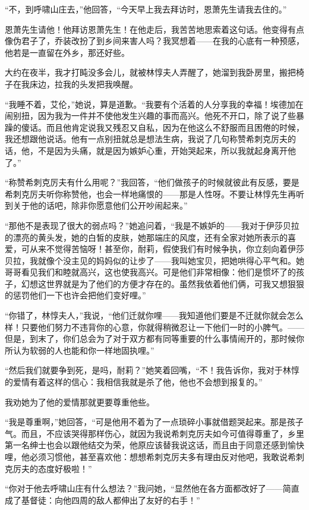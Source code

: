 \par “不，到呼啸山庄去，”他回答，“今天早上我去拜访时，恩萧先生请我去住的。”
\par 恩萧先生请他！他拜访恩萧先生！在他走后，我苦苦地思索着这句话。他变得有点像伪君子了，乔装改扮了到乡间来害人吗？我冥想着——在我的心底有一种预感，他若是一直留在外乡，那还好些。
\par 大约在夜半，我才打盹没多会儿，就被林惇夫人弄醒了，她溜到我卧房里，搬把椅子在我床边，拉我的头发把我唤醒。
\par “我睡不着，艾伦，”她说，算是道歉。“我要有个活着的人分享我的幸福！埃德加在闹别扭，因为我为一件并不使他发生兴趣的事而高兴。他死不开口，除了说了些暴躁的傻话。而且他肯定说我又残忍又自私，因为在他这么不舒服而且困倦的时候，我还想跟他说话。他有一点别扭就总是想法生病，我说了几句称赞希刺克厉夫的话，他，不是因为头痛，就是因为嫉妒心重，开始哭起来，所以我就起身离开他了。”
\par “称赞希刺克厉夫有什么用呢？”我回答，“他们做孩子的时候就彼此有反感，要是希刺克厉夫听你称赞他，也会一样地痛恨的——那是人性呀。不要让林惇先生再听到关于他的话吧，除非你愿意他们公开吵闹起来。”
\par “那他不是表现了很大的弱点吗？”她追问着，“我是不嫉妒的——我对于伊莎贝拉的漂亮的黄头发，她的白皙的皮肤，她那端庄的风度，还有全家对她所表示的喜爱，可从来不觉得苦恼呀！甚至你，耐莉，假使我们有时候争执，你立刻向着伊莎贝拉，我就像个没主见的妈妈似的让步了——我叫她宝贝，把她哄得心平气和。她哥哥看见我们和睦就高兴，这也使我高兴。可是他们非常相像：他们是惯坏了的孩子，幻想这世界就是为了他们的方便才存在的。虽然我依着他们俩，可我又想狠狠的惩罚他们一下也许会把他们变好哩。”
\par “你错了，林惇夫人，”我说，“他们迁就你哩——我知道他们要是不迁就你就会怎么样！只要他们努力不违背你的心意，你就得稍微忍让一下他们一时的小脾气。——但是，到末了，你们总会为了对于双方都有同等重要的什么事情闹开的，那时候你所认为软弱的人也能和你一样地固执哩。”
\par “然后我们就要争到死，是吗，耐莉？”她笑着回嘴，“不！我告诉你，我对于林惇的爱情有着这样的信心：我相信我就是杀了他，他也不会想到报复的。”
\par 我劝她为了他的爱情那就更要尊重他些。
\par “我是尊重啊，”她回答，“可是他用不着为了一点琐碎小事就借题哭起来。那是孩子气。而且，不应该哭得那样伤心，就因为我说希刺克厉夫如今可值得尊重了，乡里第一名绅士也会以跟他结交为荣，他原应该替我说这话，而且由于同意还感到愉快哩，他必须习惯他，甚至喜欢他：想想希刺克厉夫多有理由反对他吧，我敢说希刺克厉夫的态度好极啦！”
\par “你对于他去呼啸山庄有什么想法？”我问她，“显然他在各方面都改好了——简直成了基督徒：向他四周的敌人都伸出了友好的右手！”
